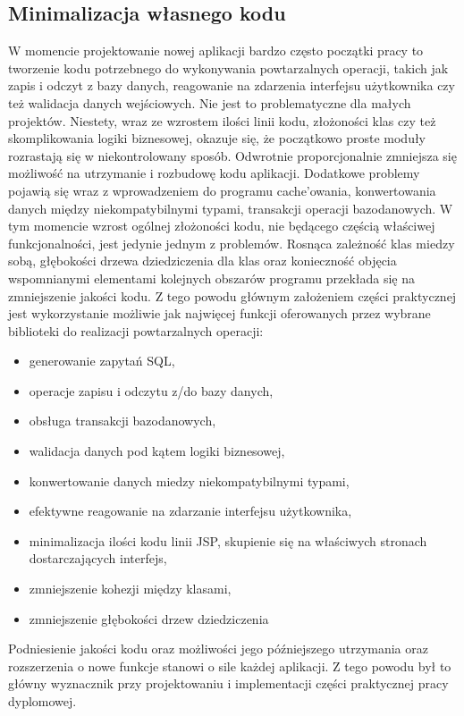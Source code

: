 		\subsection{Minimalizacja własnego kodu}
			W momencie projektowanie nowej aplikacji bardzo często początki pracy to tworzenie kodu potrzebnego do wykonywania powtarzalnych operacji, takich jak zapis i odczyt z bazy danych, reagowanie na zdarzenia interfejsu użytkownika czy też walidacja danych wejściowych. Nie jest to problematyczne dla małych projektów. Niestety, wraz ze wzrostem ilości linii kodu, złożoności klas czy też skomplikowania logiki biznesowej, okazuje się, że początkowo proste moduły rozrastają się w niekontrolowany sposób. Odwrotnie proporcjonalnie zmniejsza się możliwość na utrzymanie i rozbudowę kodu aplikacji. Dodatkowe problemy pojawią się wraz z wprowadzeniem do programu cache'owania, konwertowania danych między niekompatybilnymi typami, transakcji operacji bazodanowych. W tym momencie wzrost ogólnej złożoności kodu, nie będącego częścią właściwej funkcjonalności, jest jedynie jednym z problemów. Rosnąca zależność klas miedzy sobą, głębokości drzewa dziedziczenia dla klas oraz konieczność objęcia wspomnianymi elementami kolejnych obszarów programu przekłada się na zmniejszenie jakości kodu. Z tego powodu głównym założeniem części praktycznej jest wykorzystanie możliwie jak najwięcej funkcji oferowanych przez wybrane biblioteki do realizacji powtarzalnych operacji:
			\begin{itemize}
				\item generowanie zapytań SQL,
				\item operacje zapisu i odczytu z/do bazy danych,
				\item obsługa transakcji bazodanowych,
				\item walidacja danych pod kątem logiki biznesowej,
				\item konwertowanie danych miedzy niekompatybilnymi typami,
				\item efektywne reagowanie na zdarzanie interfejsu użytkownika,
				\item minimalizacja ilości kodu linii JSP, skupienie się na właściwych stronach dostarczających interfejs,
				\item zmniejszenie kohezji między klasami,
				\item zmniejszenie głębokości drzew dziedziczenia
			\end{itemize}
			Podniesienie jakości kodu oraz możliwości jego późniejszego utrzymania oraz rozszerzenia o nowe funkcje stanowi o sile każdej aplikacji. Z tego powodu był to główny wyznacznik przy projektowaniu i implementacji części praktycznej pracy dyplomowej.
